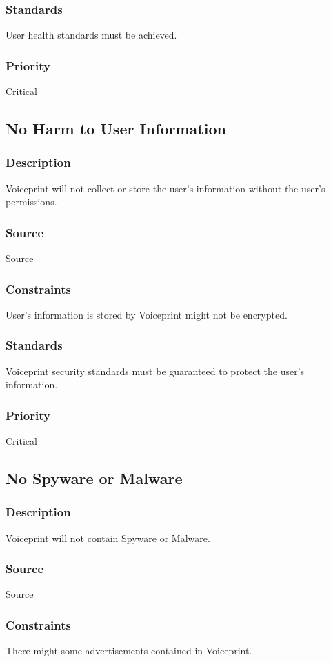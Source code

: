 \subsubsection{Standards}
User health standards must be achieved.
\subsubsection{Priority}
Critical

\subsection{No Harm to User Information}
\subsubsection{Description}
Voiceprint will not collect or store the user's information without the user's permissions.
\subsubsection{Source}
Source
\subsubsection{Constraints}
User's information is stored by Voiceprint might not be encrypted.
\subsubsection{Standards}
Voiceprint security standards must be guaranteed to protect the user's information.
\subsubsection{Priority}
Critical

\subsection{No Spyware or Malware}
\subsubsection{Description}
Voiceprint will not contain Spyware or Malware.
\subsubsection{Source}
Source
\subsubsection{Constraints}
There might some advertisements contained in Voiceprint.
